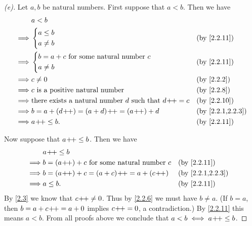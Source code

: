\begin{proof}[(e)]
  Let \(a, b\) be natural numbers.
  First suppose that \(a < b\).
  Then we have
  \begin{align*}
             & a < b                                                                                     \\
    \implies & \begin{dcases}
                 a \leq b \\
                 a \neq b
               \end{dcases}                                                      &  & \by{2.2.11}        \\
    \implies & \begin{dcases}
                 b = a + c \text{ for some natural number } c \\
                 a \neq b
               \end{dcases}                     &  & \by{2.2.11}                                         \\
    \implies & c \neq 0                                                            &  & \by{2.2.2}       \\
    \implies & c \text{ is a positive natural number}                              &  & \by{2.2.8}       \\
    \implies & \text{there exists a natural number } d \text{ such that } d\pp = c &  & \by{2.2.10}      \\
    \implies & b = a + (d\pp) = (a + d)\pp = (a\pp) + d                            &  & \by{2.2.1,2.2.3} \\
    \implies & a\pp \leq b.                                                        &  & \by{2.2.11}
  \end{align*}

  Now suppose that \(a\!+\!\!+ \leq b\).
  Then we have
  \begin{align*}
             & a\pp \leq b                                                             \\
    \implies & b = (a\pp) + c \text{ for some natural number } c &  & \by{2.2.11}      \\
    \implies & b = (a\pp) + c = (a + c)\pp = a + (c\pp)          &  & \by{2.2.1,2.2.3} \\
    \implies & a \leq b.                                         &  & \by{2.2.11}
  \end{align*}
  By \cref{2.3} we know that \(c\!+\!\!+ \neq 0\).
  Thus by \cref{2.2.6} we must have \(b \neq a\).
  (If \(b = a\), then \(b = a + c\!+\!\!+ = a + 0\) implies \(c\!+\!\!+ = 0\), a contradiction.)
  By \cref{2.2.11} this means \(a < b\).
  From all proofs above we conclude that \(a < b \iff a\!+\!\!+ \leq b\).
\end{proof}

